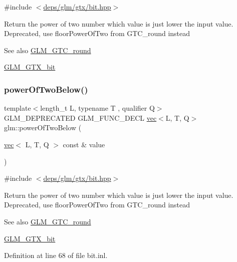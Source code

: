 {\ttfamily \#include $<$\hyperlink{bit_8hpp}{deps/glm/gtx/bit.\+hpp}$>$}

Return the power of two number which value is just lower the input value. Deprecated, use floor\+Power\+Of\+Two from G\+T\+C\+\_\+round instead

\begin{DoxySeeAlso}{See also}
\hyperlink{group__gtc__round}{G\+L\+M\+\_\+\+G\+T\+C\+\_\+round} 

\hyperlink{group__gtx__bit}{G\+L\+M\+\_\+\+G\+T\+X\+\_\+bit} 
\end{DoxySeeAlso}
\mbox{\label{group__gtx__bit_gaf78ddcc4152c051b2a21e68fecb10980}} 
\subsubsection{\texorpdfstring{power\+Of\+Two\+Below()}{powerOfTwoBelow()}\hspace{0.1cm}{\footnotesize\ttfamily [2/2]}}
{\footnotesize\ttfamily template$<$length\+\_\+t L, typename T , qualifier Q$>$ \\
G\+L\+M\+\_\+\+D\+E\+P\+R\+E\+C\+A\+T\+ED G\+L\+M\+\_\+\+F\+U\+N\+C\+\_\+\+D\+E\+CL \hyperlink{structglm_1_1vec}{vec}$<$L, T, Q$>$ glm\+::power\+Of\+Two\+Below (\begin{DoxyParamCaption}\item[{\hyperlink{structglm_1_1vec}{vec}$<$ L, T, Q $>$ const \&}]{value }\end{DoxyParamCaption})}



{\ttfamily \#include $<$\hyperlink{bit_8hpp}{deps/glm/gtx/bit.\+hpp}$>$}

Return the power of two number which value is just lower the input value. Deprecated, use floor\+Power\+Of\+Two from G\+T\+C\+\_\+round instead

\begin{DoxySeeAlso}{See also}
\hyperlink{group__gtc__round}{G\+L\+M\+\_\+\+G\+T\+C\+\_\+round} 

\hyperlink{group__gtx__bit}{G\+L\+M\+\_\+\+G\+T\+X\+\_\+bit} 
\end{DoxySeeAlso}


Definition at line 68 of file bit.\+inl.

